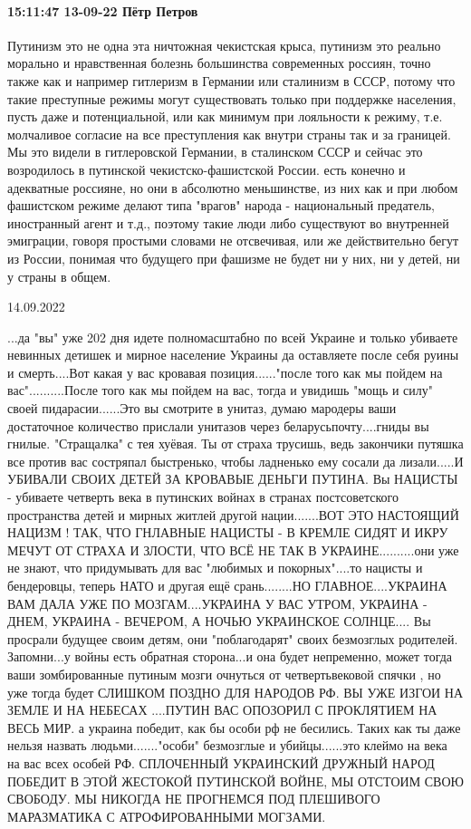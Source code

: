 \paragraph{15:11:47 13-09-22 Пётр Петров}

Путинизм это не одна эта ничтожная чекистская крыса, путинизм это реально
морально и нравственная болезнь большинства современных россиян, точно также
как и например гитлеризм в Германии или сталинизм в СССР, потому что такие
преступные режимы могут существовать только при поддержке населения, пусть даже
и потенциальной, или как минимум при лояльности к режиму, т.е. молчаливое
согласие на все преступления как внутри страны так и за границей. Мы это видели
в гитлеровской Германии, в сталинском СССР и сейчас это возродилось в путинской
чекистско-фашистской России. есть конечно и адекватные россияне, но они в
абсолютно меньшинстве, из них как и при любом фашистском режиме делают типа
"врагов" народа - национальный предатель, иностранный агент и т.д., поэтому
такие люди либо существуют во внутренней эмиграции, говоря простыми словами не
отсвечивая, или же действительно бегут из России, понимая что будущего при
фашизме не будет ни у них, ни у детей, ни у страны в общем.

14.09.2022

...да "вы" уже 202 дня идете полномасштабно по всей Украине и только убиваете
невинных детишек и мирное население Украины да оставляете после себя руины и
смерть....Вот какая у вас кровавая позиция......"после того как мы пойдем на
вас"..........После того как мы пойдем на вас, тогда и увидишь "мощь и силу"
своей пидарасии......Это вы смотрите в унитаз, думаю мародеры ваши достаточное
количество прислали унитазов через беларусьпочту....гниды вы гнилые.
"Стращалка" с тея хуёвая. Ты от страха трусишь, ведь закончики путяшка все
против вас состряпал быстренько, чтобы ладненько ему сосали да лизали.....И
УБИВАЛИ СВОИХ ДЕТЕЙ ЗА КРОВАВЫЕ ДЕНЬГИ ПУТИНА. Вы НАЦИСТЫ - убиваете четверть
века в путинских войнах в странах постсоветского пространства детей и мирных
житлей другой нации.......ВОТ ЭТО НАСТОЯЩИЙ НАЦИЗМ ! ТАК, ЧТО ГНЛАВНЫЕ НАЦИСТЫ
- В КРЕМЛЕ СИДЯТ И ИКРУ МЕЧУТ ОТ СТРАХА И ЗЛОСТИ, ЧТО ВСЁ НЕ ТАК В
УКРАИНЕ..........они уже не знают, что придумывать для вас "любимых и
покорных"....то нацисты и бендеровцы, теперь НАТО и другая ещё срань........НО
ГЛАВНОЕ....УКРАИНА ВАМ ДАЛА УЖЕ ПО МОЗГАМ....УКРАИНА У ВАС УТРОМ, УКРАИНА -
ДНЕМ, УКРАИНА - ВЕЧЕРОМ, А НОЧЬЮ УКРАИНСКОЕ СОЛНЦЕ.... Вы просрали будущее
своим детям, они "поблагодарят" своих безмозглых родителей. Запомни...у войны
есть обратная сторона...и она будет непременно, может тогда ваши зомбированные
путиным мозги очнуться от четвертьвековой спячки , но уже тогда будет СЛИШКОМ
ПОЗДНО ДЛЯ НАРОДОВ РФ. ВЫ УЖЕ ИЗГОИ НА ЗЕМЛЕ И НА НЕБЕСАХ ....ПУТИН ВАС
ОПОЗОРИЛ С ПРОКЛЯТИЕМ НА ВЕСЬ МИР. а украина победит, как бы особи рф не
бесились. Таких как ты даже нельзя назвать людьми......."особи" безмозглые и
убийцы......это клеймо на века на вас всех особей РФ. СПЛОЧЕННЫЙ УКРАИНСКИЙ
ДРУЖНЫЙ НАРОД ПОБЕДИТ В ЭТОЙ ЖЕСТОКОЙ ПУТИНСКОЙ ВОЙНЕ, МЫ ОТСТОИМ СВОЮ СВОБОДУ.
МЫ НИКОГДА НЕ ПРОГНЕМСЯ ПОД ПЛЕШИВОГО МАРАЗМАТИКА С АТРОФИРОВАННЫМИ МОГЗАМИ.



